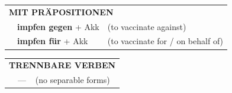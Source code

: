 \documentclass[10pt,a4paper]{revtex4-2}
\begin{document}
\begin{verbbox}
\vspace{10pt}

\begin{tabular}{lll}
\multicolumn{3}{l}{\textbf{MIT PRÄPOSITIONEN}}\\
& \textbf{impfen gegen} + Akk & (to vaccinate against)\\
& \textbf{impfen für} + Akk & (to vaccinate for / on behalf of)\\
\end{tabular}
\hfill
\begin{tabular}{lll}
\multicolumn{3}{l}{\textbf{TRENNBARE VERBEN}}\\
& --- & (no separable forms)\\
\end{tabular}
\vspace{-5pt}
\end{verbbox}
\end{document}
